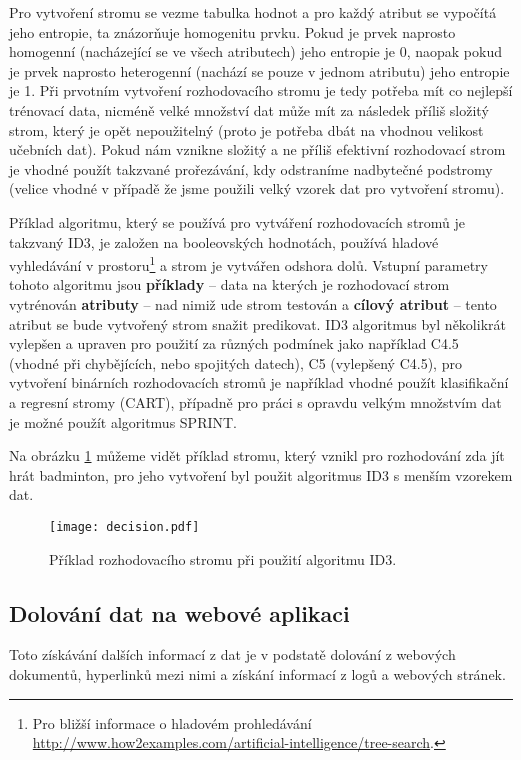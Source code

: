 \par Pro vytvoření stromu se vezme tabulka hodnot a pro každý atribut se vypočítá jeho entropie, ta znázorňuje homogenitu prvku. Pokud je prvek naprosto homogenní (nacházející se ve všech atributech) jeho entropie je 0, naopak pokud je prvek naprosto heterogenní (nachází se pouze v jednom atributu) jeho entropie je 1. Při prvotním vytvoření rozhodovacího stromu je tedy potřeba mít co nejlepší trénovací data, nicméně velké množství dat může mít za následek příliš složitý strom, který je opět nepoužitelný (proto je potřeba dbát na vhodnou velikost učebních dat). Pokud nám vznikne složitý a ne příliš efektivní rozhodovací strom je vhodné použít takzvané prořezávání, kdy odstraníme nadbytečné podstromy (velice vhodné v případě že jsme použili velký vzorek dat pro vytvoření stromu).

\par Příklad algoritmu, který se používá pro vytváření rozhodovacích stromů je takzvaný ID3, je založen na booleovských hodnotách, používá hladové vyhledávání v prostoru\footnote{Pro bližší informace o hladovém prohledávání \url{http://www.how2examples.com/artificial-intelligence/tree-search}.} a strom je vytvářen odshora dolů. Vstupní parametry tohoto algoritmu jsou \textbf{příklady} -- data na kterých je rozhodovací strom vytrénován \textbf{atributy} -- nad nimiž ude strom testován a \textbf{cílový atribut} -- tento atribut se bude vytvořený strom snažit predikovat. ID3 algoritmus byl několikrát vylepšen a upraven pro použití za různých podmínek jako například C4.5 (vhodné při chybějících, nebo spojitých datech), C5 (vylepšený C4.5), pro vytvoření binárních rozhodovacích stromů je například vhodné použít klasifikační a regresní stromy (CART), případně pro práci s opravdu velkým množstvím dat je možné použít algoritmus SPRINT.

\par Na obrázku \ref{decision-tree} můžeme vidět příklad stromu, který vznikl pro rozhodování zda jít hrát badminton, pro jeho vytvoření byl použit algoritmus ID3 s menším vzorekem dat.
\begin{figure}[htp]
\centering
\texttt{[image: decision.pdf]}
\caption{Příklad rozhodovacího stromu při použití algoritmu ID3.}
\label{decision-tree}
\end{figure}

\subsection{Dolování dat na webové aplikaci}
\par Toto získávání dalších informací z dat je v podstatě dolování z webových dokumentů, hyperlinků mezi nimi a získání informací z logů a webových stránek. \cite{minigbook}

